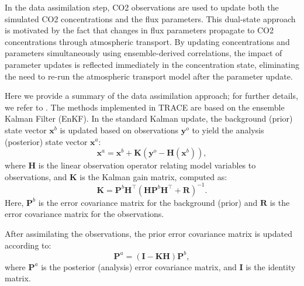 \documentclass[a4,12pt]{article}
\begin{document}
In the data assimilation step,
CO2 observations are used to update both the simulated CO2 concentrations and the flux parameters.
This dual-state approach is motivated by the fact that changes in flux parameters propagate to CO2 concentrations through atmospheric transport.
By updating concentrations and parameters simultaneously using ensemble-derived correlations,
the impact of parameter updates is reflected immediately in the concentration state,
eliminating the need to re-run the atmospheric transport model after the parameter update.

Here we provide a summary of the data assimilation approach;
for further details,
we refer to \citet{chen2023}.
The methods implemented in TRACE are based on the ensemble Kalman Filter (EnKF).
In the standard Kalman update,
the background (prior) state vector $\mathbf{x}^b$ is updated based on observations $\mathbf{y}^o$
to yield the analysis (posterior) state vector $\mathbf{x}^a$:
\begin{equation}
    \label{eq:enkf_update}
    \mathbf{x}^a = \mathbf{x}^b + \mathbf{K}(\mathbf{y}^o - \mathbf{H}(\mathbf{x}^b)),
\end{equation}
where $\mathbf{H}$ is the linear observation operator relating model variables to observations,
and $\mathbf{K}$ is the Kalman gain matrix,
computed as:
\begin{equation}
    \label{eq:kalman_gain}
    \mathbf{K} = \mathbf{P}^b \mathbf{H}^\top (\mathbf{H}\mathbf{P}^b \mathbf{H}^\top + \mathbf{R})^{-1}.
\end{equation}
Here,
$\mathbf{P}^b$ is the error covariance matrix for the background (prior) and
$\mathbf{R}$ is the error covariance matrix for the observations.

After assimilating the observations,
the prior error covariance matrix is updated according to:
\begin{equation}
    \label{eq:posterior_cov}
    \mathbf{P}^a = (\mathbf{I} - \mathbf{K}\mathbf{H})\mathbf{P}^b,
\end{equation}
where $\mathbf{P}^a$ is the posterior (analysis) error covariance matrix,
and $\mathbf{I}$ is the identity matrix.
\end{document}
